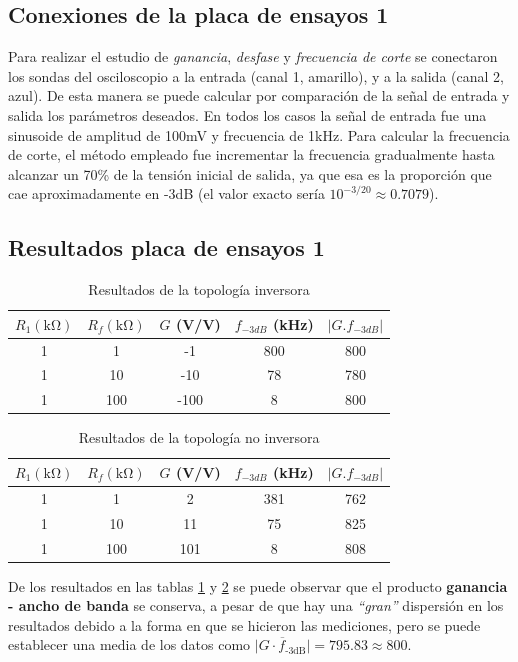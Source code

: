 \documentclass[letterpaper, 10 pt, conference]{ieeeconf}  %
\begin{document}
\subsection{Conexiones de la placa de ensayos 1}
Para realizar el estudio de \textit{ganancia}, \textit{desfase} y \textit{frecuencia de corte} se conectaron los sondas del osciloscopio a la entrada (canal 1, amarillo), y a la salida (canal 2, azul). De esta manera se puede calcular por comparación de la señal de entrada y salida los parámetros deseados. En todos los casos la señal de entrada fue una sinusoide de amplitud de 100mV y frecuencia de 1kHz. Para calcular la frecuencia de corte, el método empleado fue incrementar la frecuencia gradualmente hasta alcanzar un 70\% de la tensión inicial de salida, ya que esa es la proporción que cae aproximadamente en -3dB (el valor exacto sería $10^{-3/20} \approx 0.7079$).

\subsection{Resultados placa de ensayos 1}
\begin{table}[H]
\centering
\caption{Resultados de la topología inversora}
\label{tab:resultadosInversora}
\begin{tabular}{|c|c|c|c|c|}
\hline
$R_{1} (\unit{\kilo\ohm})$ & $R_{f} (\unit{\kilo\ohm})$ & $G$ (V/V) & $f_{-3dB}$ (\unit{\kilo\hertz}) & $|G.f_{-3dB}|$ \\
\hline
1 & 1 & -1 & 800 & 800 \\
1 & 10 & -10 & 78 & 780 \\
1 & 100 & -100 & 8 & 800 \\
\hline
\end{tabular}
\end{table}
\begin{table}[H]
\centering
\caption{Resultados de la topología no inversora}
\label{tab:resultadosNoInversora}
\begin{tabular}{|c|c|c|c|c|}
\hline
$R_{1} (\unit{\kilo\ohm})$ & $R_{f} (\unit{\kilo\ohm})$ & $G$ (V/V) & $f_{-3dB}$ (\unit{\kilo\hertz}) & $|G.f_{-3dB}|$ \\
\hline
1 & 1 & 2 & 381 & 762 \\
1 & 10 & 11 & 75 & 825 \\
1 & 100 & 101 & 8 & 808 \\
\hline
\end{tabular}
\end{table}

De los resultados en las tablas \ref{tab:resultadosInversora} y \ref{tab:resultadosNoInversora} se puede observar que el producto \textbf{ganancia - ancho de banda} se conserva, a pesar de que hay una \textit{``gran''} dispersión en los resultados debido a la forma en que se hicieron las mediciones, pero se puede establecer una media de los datos como $\overline{|G \cdot f_{\text{-3dB}}|} = 795.83 \approx 800 $.
\end{document}
